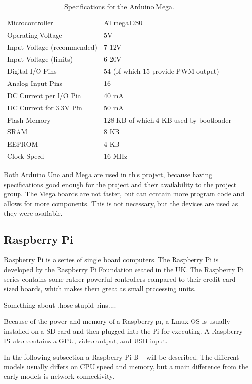 \begin{table}[h!]
\begin{tabular}{| l | l |}
\hline
Microcontroller & ATmega1280\\
Operating Voltage & 5V\\
Input Voltage (recommended) & 7-12V\\
Input Voltage (limits) & 6-20V\\
Digital I/O Pins & 54 (of which 15 provide PWM output)\\
Analog Input Pins & 16\\
DC Current per I/O Pin & 40 mA\\
DC Current for 3.3V Pin & 50 mA\\
Flash Memory & 128 KB of which 4 KB used by bootloader\\
SRAM & 8 KB\\
EEPROM & 4 KB\\
Clock Speed & 16 MHz\\
\hline
\end{tabular}
\caption{Specifications for the Arduino Mega\cite{arduinomega}.}
\end{table}
\label{tab:megaspec}


Both Arduino Uno and Mega are used in this project, because having specifications good enough for the project and their availability to the project group. The Mega boards are not faster, but can contain more program code and allows for more components. This is not necessary, but the devices are used as they were available.

\subsection{Raspberry Pi}
Raspberry Pi is a series of single board computers. The Raspberry Pi is developed by the Raspberry Pi Foundation seated in the UK. The Raspberry Pi series contains some rather powerful controllers compared to their credit card sized boards, which makes them great as small processing units.

Something about those stupid pins....

Because of the power and memory of a Raspberry pi, a Linux OS is usually installed on a SD card and then plugged into the Pi for executing. A Raspberry Pi also contains a GPU, video output, and USB input.

In the following subsection a Raspberry Pi B+ will be described. The different models usually differs on CPU speed and memory, but a main difference from the early models is network connectivity.

